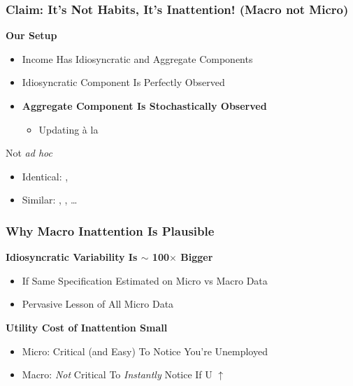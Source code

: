 \documentclass{beamer}\usepackage{dcolumn}
\newcommand{\jbemph}[1]{\textbf{\color{SlideNavy}#1}}
\begin{document}
\begin{frame}
\frametitle{Claim: It's Not Habits, It's Inattention! (Macro not Micro)}
\jbemph{\large Our Setup}
\begin{itemize}
\item   Income Has Idiosyncratic and Aggregate Components
\item   Idiosyncratic Component Is Perfectly Observed
\item   \jbemph{Aggregate Component Is Stochastically Observed}\\
  \begin{itemize}
\item Updating \`a la \cite{calvoPrices}
  \end{itemize}

\end{itemize}
\begin{block}{ Not {\em ad hoc}}
\begin{itemize}
\item Identical: \cite{mrSlumps}, \cite{carroll:epidemicinflQJE}
\item Similar: \cite{reis:inattentive}, \cite{simsInattention},   \dots
\end{itemize}
\end{block}

\end{frame}



\begin{frame}
\frametitle{Why Macro Inattention Is Plausible}

\begin{block}{\textbf{Idiosyncratic Variability Is $\sim$ 100$\times$ Bigger}}
\begin{itemize}
\item  If Same Specification Estimated on Micro vs Macro Data
\item  Pervasive Lesson of All Micro Data
\end{itemize}
\end{block}

\begin{block}{\textbf{Utility Cost of Inattention Small}}
\begin{itemize}
\item  Micro: Critical (and Easy) To Notice You're Unemployed
\item  Macro: {\it Not} Critical To {\it Instantly} Notice If U $\uparrow$
\end{itemize}
\end{block}
\end{frame}
\end{document}
